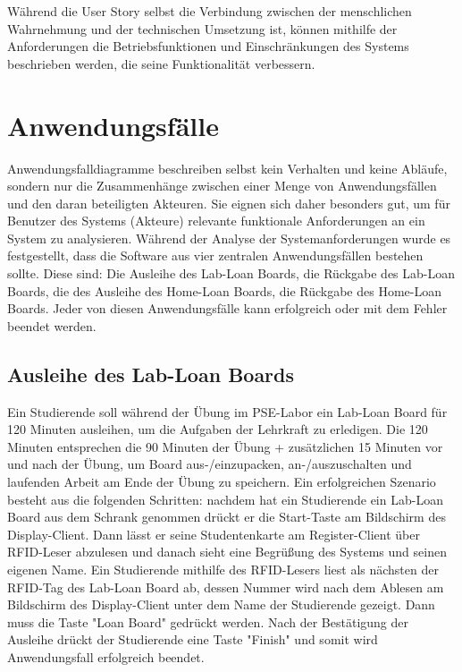 Während die User Story selbst die Verbindung zwischen der menschlichen Wahrnehmung und der technischen Umsetzung ist, können mithilfe der Anforderungen die Betriebsfunktionen und Einschränkungen des Systems beschrieben werden, die seine Funktionalität verbessern.

\section{Anwendungsfälle}
\label{sec:design:use_cases}
Anwendungsfalldiagramme beschreiben selbst kein Verhalten und keine Abläufe, sondern nur die Zusammenhänge zwischen einer Menge von Anwendungsfällen und den daran beteiligten Akteuren. Sie eignen sich daher besonders gut, um für Benutzer des Systems (Akteure) relevante funktionale Anforderungen an ein System zu analysieren\cite{website:21}. Während der Analyse der Systemanforderungen wurde es festgestellt, dass die Software aus vier zentralen Anwendungsfällen bestehen sollte. Diese sind: Die Ausleihe des Lab-Loan Boards, die Rückgabe des Lab-Loan Boards, die des Ausleihe des Home-Loan Boards, die Rückgabe des Home-Loan Boards. Jeder von diesen Anwendungsfälle kann erfolgreich oder mit dem Fehler beendet werden.

\subsection{Ausleihe des Lab-Loan Boards}
\label{sec:design:use_cases:lab_loan}
Ein Studierende soll während der Übung im PSE-Labor ein Lab-Loan Board für 120 Minuten ausleihen, um die Aufgaben der Lehrkraft zu erledigen. Die 120 Minuten entsprechen die 90 Minuten der Übung + zusätzlichen 15 Minuten vor und nach der Übung, um Board aus-/einzupacken, an-/auszuschalten und laufenden Arbeit am Ende der Übung zu speichern. 
Ein erfolgreichen Szenario besteht aus die folgenden Schritten: nachdem hat ein Studierende ein Lab-Loan Board aus dem Schrank genommen drückt er die Start-Taste am Bildschirm des Display-Client. Dann lässt er seine Studentenkarte am Register-Client über RFID-Leser abzulesen und danach sieht eine Begrüßung des Systems und seinen eigenen Name. Ein Studierende mithilfe des RFID-Lesers liest als nächsten der RFID-Tag des Lab-Loan Board ab, dessen Nummer wird nach dem Ablesen am Bildschirm des Display-Client unter dem Name der Studierende gezeigt. Dann muss die Taste "Loan Board" gedrückt werden. Nach der Bestätigung der Ausleihe drückt der Studierende eine Taste "Finish" und somit wird Anwendungsfall erfolgreich beendet. 

